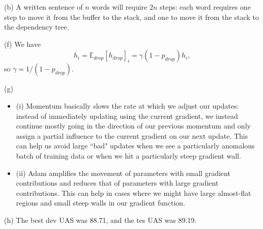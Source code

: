 \documentclass{article}
\begin{document}
(b) A written sentence of $n$ words will require $2n$ steps: each word requires one step to move it from the buffer to the stack, and one to move it from the stack to the dependency tree.

(f) We have
$$ h_i = \mathbb{E}_{drop}[h_{drop}]_i = \gamma (1 - p_{drop}) h_i,$$
so $\gamma = 1/(1 - p_{drop})$.

(g)
\begin{itemize}
\item (i) Momentum basically slows the rate at which we adjust our updates: instead of immediately updating using the current gradient, we instead continue mostly going in the direction of our previous momentum and only assign a partial influence to the current gradient on our next update. This can help us avoid large ``bad" updates when we see a particularly anomalous batch of training data or when we hit a particularly steep gradient wall.
\item (ii) Adam amplifies the movement of parameters with small gradient contributions and reduces that of parameters with large gradient contributions. This can help in cases where we might have large almost-flat regions and small steep walls in our gradient function.
\end{itemize}

(h) The best dev UAS was 88.71, and the tes UAS was 89.19.
\end{document}
